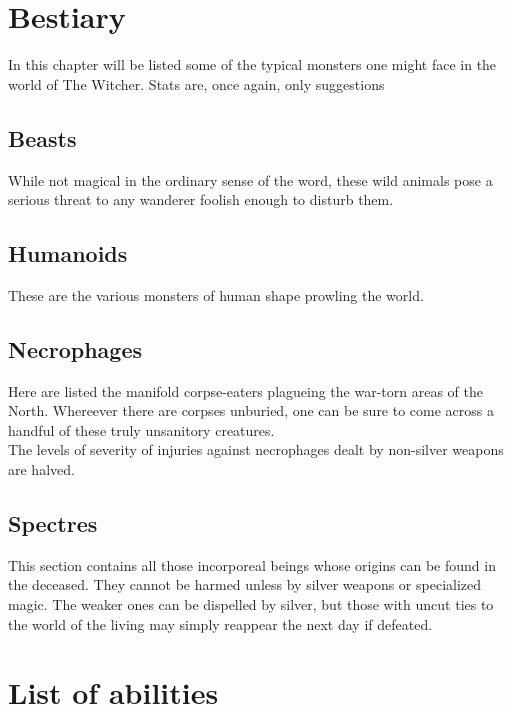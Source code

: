 \documentclass[parskip=full,11pt,%
footheight=38pt]{scrreport}
\begin{document}
\normalsize

\chapter{Bestiary}
In this chapter will be listed some of the typical monsters one might face in the world of The Witcher.
Stats are, once again, only suggestions

\section{Beasts}
While not magical in the ordinary sense of the word, these wild animals pose a serious threat to any wanderer
foolish enough to disturb them.


\section{Humanoids}
These are the various monsters of human shape prowling the world.


\section{Necrophages}
Here are listed the manifold corpse-eaters plagueing the war-torn areas of the North. Whereever there
are corpses unburied, one can be sure to come across a handful of these truly unsanitory creatures.
\\[1.5ex]
The levels of severity of injuries against necrophages dealt by non-silver weapons are halved.


\section{Spectres}\label{monster:spectre}
This section contains all those incorporeal beings whose origins can be found in the deceased. They cannot be
harmed unless by silver weapons or specialized magic. The weaker ones can be dispelled by silver, but those
with uncut ties to the world of the living may simply reappear the next day if defeated.


\chapter{List of abilities}

\abilitylist
\end{document}
